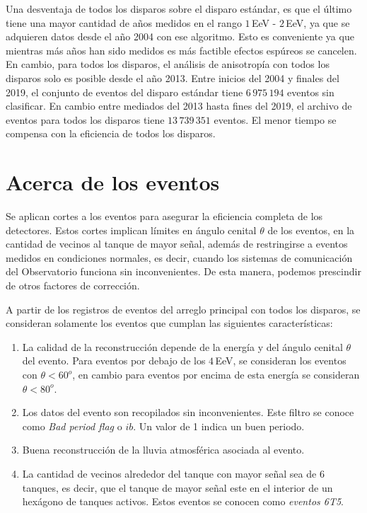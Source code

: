 Una desventaja de todos los disparos sobre el disparo estándar, es que el último tiene una mayor cantidad de años medidos en el rango $1\,$EeV - $2\,$EeV, ya que se adquieren datos  desde el año 2004 con ese algoritmo. Esto es conveniente ya que mientras más años han sido medidos es más factible efectos espúreos se cancelen. En cambio, para todos los disparos, el análisis de anisotropía con todos los disparos solo es posible desde el año 2013. Entre inicios del 2004 y finales del 2019, el conjunto de eventos del disparo estándar tiene $6\,975\,194$ eventos sin clasificar. En cambio entre mediados del 2013 hasta fines del 2019, el archivo de eventos para todos los disparos tiene $13\,739\,351$ eventos. El menor tiempo se compensa con la eficiencia de todos los disparos.


\section{Acerca de los eventos} \label{filtro}

Se aplican cortes a los eventos para asegurar la eficiencia completa de los detectores. Estos cortes implican límites en ángulo cenital $\theta$ de los eventos, en la cantidad de vecinos al tanque de mayor señal, además de restringirse a eventos medidos en condiciones normales, es decir, cuando los sistemas de comunicación del Observatorio funciona sin inconvenientes. De esta manera, podemos prescindir de otros factores de corrección.

A partir de los registros de eventos del arreglo principal con todos los disparos, se consideran solamente los eventos que cumplan las siguientes características:

    \begin{enumerate}
      \item La calidad de la reconstrucción depende de la energía y del ángulo cenital $\theta$ del evento.  Para eventos por debajo de los $4\,$EeV, se consideran los eventos con $\theta < 60^o$, en cambio para eventos por encima de esta energía se consideran $\theta < 80^o$.
      \item Los datos del evento son recopilados sin inconvenientes. Este filtro se conoce como \emph{Bad period flag} o $ib$. Un valor de 1 indica un buen periodo.
      \item Buena reconstrucción de la lluvia atmosférica asociada al evento.
      \item La cantidad de vecinos alrededor del tanque con mayor señal sea de 6 tanques, es decir, que el tanque de mayor señal este en el interior de un hexágono de tanques activos. Estos eventos se conocen como \textit{eventos 6T5}.
    \end{enumerate}


